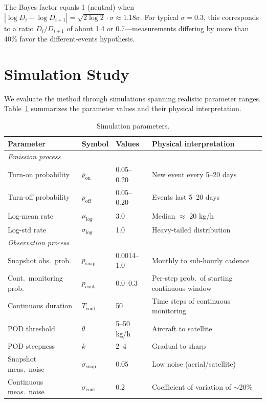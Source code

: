 \documentclass[11pt]{article}
\newcommand{\edit}[1]{{\color{magenta}#1}}
\begin{document}
The Bayes factor equals 1 (neutral) when $|\log D_i - \log D_{i+1}| = \sqrt{2\log 2} \cdot \sigma \approx 1.18\sigma$. For typical $\sigma = 0.3$, this corresponds to a ratio $D_i/D_{i+1}$ of about 1.4 or 0.7---measurements differing by more than 40\% favor the different-events hypothesis.


\section{Simulation Study}
\label{sec:simulation}

We evaluate the method through simulations spanning realistic parameter ranges. Table~\ref{tab:params} summarizes the parameter values and their physical interpretation.

\begin{table}[h]
\centering
\caption{Simulation parameters.}
\label{tab:params}
\begin{tabular}{llll}
\toprule
Parameter & Symbol & Values & Physical interpretation \\
\midrule
\multicolumn{4}{l}{\textit{Emission process}} \\
Turn-on probability & $p_{\text{on}}$ & 0.05--0.20 & New event every 5--20 days \\
Turn-off probability & $p_{\text{off}}$ & 0.05--0.20 & Events last 5--20 days \\
Log-mean rate & $\mu_{\log}$ & 3.0 & Median $\approx$ 20 kg/h \\
Log-std rate & $\sigma_{\log}$ & 1.0 & Heavy-tailed distribution \\
\midrule
\multicolumn{4}{l}{\textit{Observation process}} \\
Snapshot obs.\ prob. & $p_{\text{snap}}$ & \edit{0.0014--1.0} & \edit{Monthly to sub-hourly cadence} \\
Cont.\ monitoring prob. & $p_{\text{cont}}$ & 0.0--0.3 & Per-step prob.\ of starting continuous window \\
Continuous duration & $T_{\text{cont}}$ & 50 & Time steps of continuous monitoring \\
POD threshold & $\theta$ & 5--50 kg/h & Aircraft to satellite \\
POD steepness & $k$ & 2--4 & Gradual to sharp \\
Snapshot meas.\ noise & $\sigma_{\text{snap}}$ & 0.05 & Low noise (aerial/satellite) \\
Continuous meas.\ noise & $\sigma_{\text{cont}}$ & 0.2 & Coefficient of variation of $\sim$20\% \\

\bottomrule
\end{tabular}
\end{table}
\end{document}
